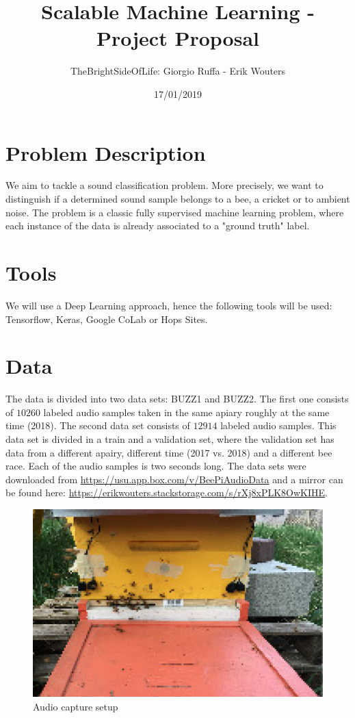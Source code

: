 \documentclass[a4paper]{article}
\title{Scalable Machine Learning - Project Proposal}
\author{TheBrightSideOfLife: Giorgio Ruffa - Erik Wouters}
\date{17/01/2019}
\begin{document}
\maketitle

\section{Problem Description}
We aim to tackle a sound classification problem. 
More precisely, we want to distinguish if a determined sound sample belongs to a bee, a cricket or to ambient noise.
The problem is a classic fully supervised machine learning problem, where each instance of the data is already associated to a "ground truth" label.

\section{Tools}
We will use a Deep Learning approach, hence the following tools will be used: Tensorflow, Keras, Google CoLab or Hops Sites.

\section{Data}

The data is divided into two data sets: BUZZ1 and BUZZ2. The first one consists of $10260$ labeled audio samples taken in the same apiary roughly at the same time (2018). The second data set consists of $12914$ labeled audio samples. This data set is divided in a train and a validation set, where the validation set has data from a different apairy, different time (2017 vs. 2018) and a different bee race. Each of the audio samples is two seconds long. The data sets were downloaded from \url{https://usu.app.box.com/v/BeePiAudioData} \cite{BeePi} and a mirror can be found here: \url{https://erikwouters.stackstorage.com/s/rXj8xPLK8OwKIHE}.

\begin{figure}[ht]
  \centering
  \includegraphics[scale=0.2]{Images/beepi_setup.png}
  \caption{Audio capture setup}
  \label{fig:beepi_setup}
\end{figure}
\end{document}
